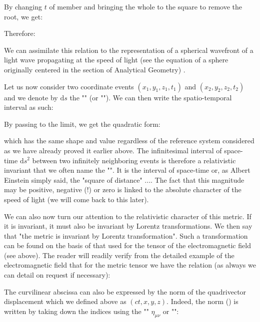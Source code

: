 	By changing $t$ of member and bringing the whole to the square to remove the root, we get:
	
	Therefore:
	
	\begin{tcolorbox}[title=Remark,colframe=black,arc=10pt]
	We can assimilate this relation to the representation of a spherical wavefront of a light wave propagating at the speed of light (see the equation of a sphere originally centered in the section of Analytical Geometry) .
	\end{tcolorbox}
	Let us now consider two coordinate events $(x_1,y_1,z_1,t_1)$ and $(x_2,y_2,z_2,t_2)$ and we denote by $\mathrm{d}s$ the "" (or ""). We can then write the spatio-temporal interval as such:
	
	By passing to the limit, we get the quadratic form:
	
	which has the same shape and value regardless of the reference system considered as we have already proved it earlier above. The infinitesimal interval of space-time $\mathrm{d}s^2$ between two infinitely neighboring events is therefore a relativistic invariant that we often name the "". It is the interval of space-time or, as Albert Einstein simply said, the "square of distance" .... The fact that this magnitude may be positive, negative (!) or zero is linked to the absolute character of the speed of light (we will come back to this later).

	We can also now turn our attention to the relativistic character of this metric. If it is invariant, it must also be invariant by Lorentz transformations. We then say that "the metric is invariant by Lorentz transformation". Such a transformation can be found on the basis of that used for the tensor of the electromagnetic field (see above). The reader will readily verify from the detailed example of the electromagnetic field that for the metric tensor we have the relation (as always we can detail on request if necessary):
	
	The curvilinear abscissa can also be expressed by the norm of the quadrivector displacement which we defined above as $(ct,x,y,z)$. Indeed, the norm () is written by taking down the indices using the "" $\eta_{\mu\nu}$ or "":
	
